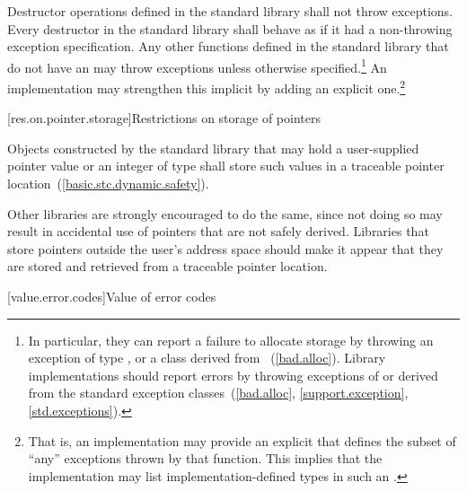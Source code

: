 \pnum
Destructor operations defined in the \Cpp standard library
shall not throw exceptions.
Every destructor in the \Cpp standard library shall behave as if it had a
non-throwing exception specification.
Any other functions defined in the
\Cpp standard library
%
that do not have an
may throw  exceptions
unless otherwise specified.\footnote{In particular, they
can report a failure to allocate storage by throwing an exception of type
,
or a class derived from
~(\ref{bad.alloc}).
Library implementations should
report errors by throwing exceptions of or derived
from the standard exception classes~(\ref{bad.alloc},
\ref{support.exception}, \ref{std.exceptions}).}
An implementation may strengthen this implicit
by adding an explicit one.\footnote{That is, an implementation may provide an explicit
that defines the subset of ``any'' exceptions thrown by that function.
This implies that the implementation may list implementation-defined types
in such an
%
%
.}

[res.on.pointer.storage]{Restrictions on storage of pointers}

\pnum
{}%
%
Objects constructed by the standard library that may hold a user-supplied pointer value
or an integer of type  shall store such values in a traceable
pointer location~(\ref{basic.stc.dynamic.safety}). \begin{note} Other libraries are
strongly encouraged to do the same, since not doing so may result in accidental use of
pointers that are not safely derived. Libraries that store pointers outside the user's
address space should make it appear that they are stored and retrieved from a traceable
pointer location. \end{note}

[value.error.codes]{Value of error codes}

